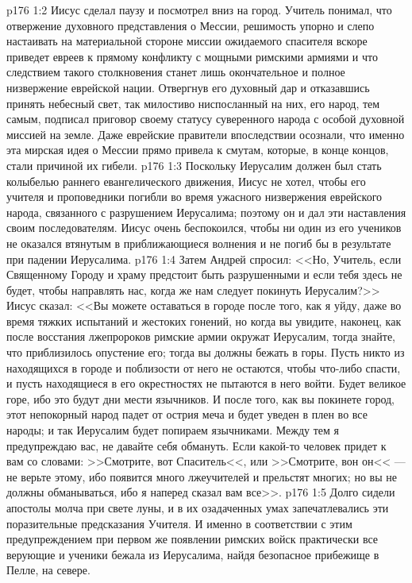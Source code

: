 \vs p176 1:2 Иисус сделал паузу и посмотрел вниз на город. Учитель понимал, что отвержение духовного представления о Мессии, решимость упорно и слепо настаивать на материальной стороне миссии ожидаемого спасителя вскоре приведет евреев к прямому конфликту с мощными римскими армиями и что следствием такого столкновения станет лишь окончательное и полное низвержение еврейской нации. Отвергнув его духовный дар и отказавшись принять небесный свет, так милостиво ниспосланный на них, его народ, тем самым, подписал приговор своему статусу суверенного народа с особой духовной миссией на земле. Даже еврейские правители впоследствии осознали, что именно эта мирская идея о Мессии прямо привела к смутам, которые, в конце концов, стали причиной их гибели.
\vs p176 1:3 Поскольку Иерусалим должен был стать колыбелью раннего евангелического движения, Иисус не хотел, чтобы его учителя и проповедники погибли во время ужасного низвержения еврейского народа, связанного с разрушением Иерусалима; поэтому он и дал эти наставления своим последователям. Иисус очень беспокоился, чтобы ни один из его учеников не оказался втянутым в приближающиеся волнения и не погиб бы в результате при падении Иерусалима.
\vs p176 1:4 Затем Андрей спросил: <<Но, Учитель, если Священному Городу и храму предстоит быть разрушенными и если тебя здесь не будет, чтобы направлять нас, когда же нам следует покинуть Иерусалим?>> Иисус сказал: <<Вы можете оставаться в городе после того, как я уйду, даже во время тяжких испытаний и жестоких гонений, но когда вы увидите, наконец, как после восстания лжепророков римские армии окружат Иерусалим, тогда знайте, что приблизилось опустение его; тогда вы должны бежать в горы. Пусть никто из находящихся в городе и поблизости от него не остаются, чтобы что\hyp{}либо спасти, и пусть находящиеся в его окрестностях не пытаются в него войти. Будет великое горе, ибо это будут дни мести язычников. И после того, как вы покинете город, этот непокорный народ падет от острия меча и будет уведен в плен во все народы; и так Иерусалим будет попираем язычниками. Между тем я предупреждаю вас, не давайте себя обмануть. Если какой\hyp{}то человек придет к вам со словами: >>Смотрите, вот Спаситель<<, или >>Смотрите, вон он<< --- не верьте этому, ибо появится много лжеучителей и прельстят многих; но вы не должны обманываться, ибо я наперед сказал вам все>>.
\vs p176 1:5 Долго сидели апостолы молча при свете луны, и в их озадаченных умах запечатлевались эти поразительные предсказания Учителя. И именно в соответствии с этим предупреждением при первом же появлении римских войск практически все верующие и ученики бежала из Иерусалима, найдя безопасное прибежище в Пелле, на севере.
